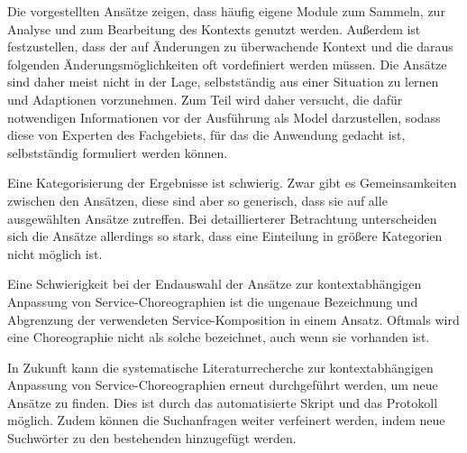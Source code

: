 \documentclass[conference,compsoc,ngerman]{IEEEtran}
\begin{document}
Die vorgestellten Ansätze zeigen, dass häufig eigene Module zum Sammeln, zur Analyse und zum Bearbeitung des Kontexts genutzt werden. Außerdem ist festzustellen, dass der auf Änderungen zu überwachende Kontext und die daraus folgenden Änderungsmöglichkeiten oft vordefiniert werden müssen. Die Ansätze sind daher meist nicht in der Lage, selbstständig aus einer Situation zu lernen und Adaptionen vorzunehmen. Zum Teil wird daher versucht, die dafür notwendigen Informationen vor der Ausführung als Model darzustellen, sodass diese von Experten des Fachgebiets, für das die Anwendung gedacht ist, selbstständig formuliert werden können.

Eine Kategorisierung der Ergebnisse ist schwierig. Zwar gibt es Gemeinsamkeiten zwischen den Ansätzen, diese sind aber so generisch, dass sie auf alle ausgewählten Ansätze zutreffen. Bei detaillierterer Betrachtung unterscheiden sich die Ansätze allerdings so stark, dass eine Einteilung in größere Kategorien nicht möglich ist.

Eine Schwierigkeit bei der Endauswahl der Ansätze zur kontextabhängigen Anpassung von Service-Choreographien ist die ungenaue Bezeichnung und Abgrenzung der verwendeten Service-Komposition in einem Ansatz. Oftmals wird eine Choreographie nicht als solche bezeichnet, auch wenn sie vorhanden ist.

In Zukunft kann die systematische Literaturrecherche zur kontextabhängigen Anpassung von Service-Choreographien erneut durchgeführt werden, um neue Ansätze zu finden. Dies ist durch das automatisierte Skript und das Protokoll möglich. Zudem können die Suchanfragen weiter verfeinert werden, indem neue Suchwörter zu den bestehenden hinzugefügt werden.

%
%





\end{document}
